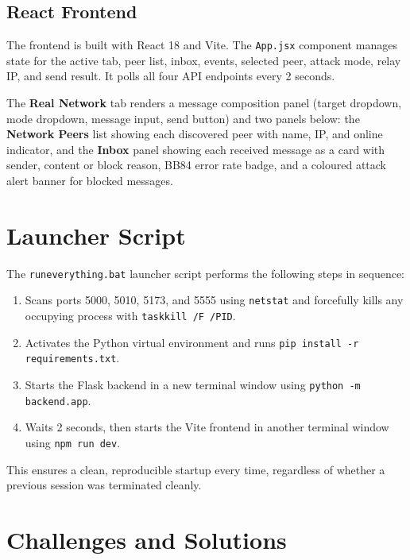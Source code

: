 \subsection{React Frontend}

The frontend is built with React 18 and Vite. The \texttt{App.jsx} component manages state for the active tab, peer list, inbox, events, selected peer, attack mode, relay IP, and send result. It polls all four API endpoints every 2 seconds.

The \textbf{Real Network} tab renders a message composition panel (target dropdown, mode dropdown, message input, send button) and two panels below: the \textbf{Network Peers} list showing each discovered peer with name, IP, and online indicator, and the \textbf{Inbox} panel showing each received message as a card with sender, content or block reason, BB84 error rate badge, and a coloured attack alert banner for blocked messages.

\section{Launcher Script}

The \texttt{runeverything.bat} launcher script performs the following steps in sequence:

\begin{enumerate}
    \item Scans ports 5000, 5010, 5173, and 5555 using \texttt{netstat} and forcefully kills any occupying process with \texttt{taskkill /F /PID}.
    \item Activates the Python virtual environment and runs \texttt{pip install -r requirements.txt}.
    \item Starts the Flask backend in a new terminal window using \texttt{python -m backend.app}.
    \item Waits 2 seconds, then starts the Vite frontend in another terminal window using \texttt{npm run dev}.
\end{enumerate}

This ensures a clean, reproducible startup every time, regardless of whether a previous session was terminated cleanly.

\section{Challenges and Solutions}

